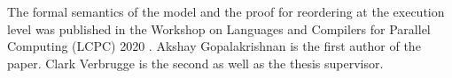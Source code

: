 




The formal semantics of the model and the proof for reordering at the execution level was published in the Workshop on Languages and Compilers for Parallel Computing (LCPC) 2020 \cite{Akshay}. 
Akshay Gopalakrishnan is the first author of the paper.
Clark Verbrugge is the second as well as the thesis supervisor. 